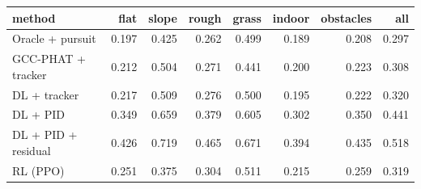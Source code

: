 \begin{tabular}{lrrrrrrr}
\toprule
method & flat & slope & rough & grass & indoor & obstacles & all\\
\midrule
Oracle + pursuit & 0.197 & 0.425 & 0.262 & 0.499 & 0.189 & 0.208 & 0.297 \\
GCC-PHAT + tracker & 0.212 & 0.504 & 0.271 & 0.441 & 0.200 & 0.223 & 0.308 \\
DL + tracker & 0.217 & 0.509 & 0.276 & 0.500 & 0.195 & 0.222 & 0.320 \\
DL + PID & 0.349 & 0.659 & 0.379 & 0.605 & 0.302 & 0.350 & 0.441 \\
DL + PID + residual & 0.426 & 0.719 & 0.465 & 0.671 & 0.394 & 0.435 & 0.518 \\
RL (PPO) & 0.251 & 0.375 & 0.304 & 0.511 & 0.215 & 0.259 & 0.319 \\
\bottomrule
\end{tabular}
